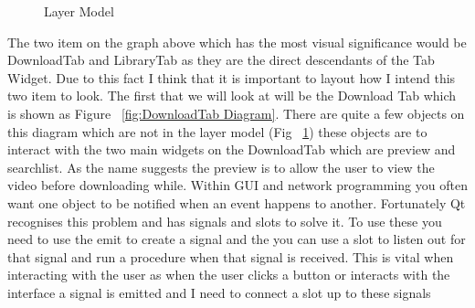 \documentclass{article}
\begin{document}
\begin{figure}[H]
    \centering
    \caption{Layer Model} \label{fig:Layer Model}
\end{figure}
The two item on the graph above which has the most visual significance would be
DownloadTab and LibraryTab as they are the direct descendants of the Tab Widget.
Due to this fact I think that it is important to layout how I intend this two item to
look. The first that we will look at will be the Download Tab which is shown as Figure
~\ref{fig:DownloadTab Diagram}. There are quite a few objects on this diagram which are
not in the layer model (Fig ~\ref{fig:Layer Model}) these objects are to interact with
the two main widgets on the DownloadTab which are preview and searchlist. As the name
suggests the preview is to allow the user to view the video before downloading while.
Within GUI and network programming you often want one object to be notified when an event
happens to another. Fortunately Qt recognises this problem and has signals and slots to
solve it. To use these you need to use the emit to create a signal and the you can use
a slot to listen out for that signal and run a procedure when that signal is received.
This is vital when interacting with the user as when the user clicks a button or interacts
with the interface a signal is emitted and I need to connect a slot up to these signals
\end{document}
